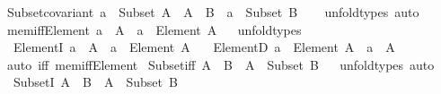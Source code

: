 \begin{isabellebody}
\isanewline
{}\isamarkupfalse%
\ Subset{\isacharunderscore}{\kern0pt}covariant{\isacharcolon}{\kern0pt}\ {\isachardoublequoteopen}a\ {\isacharcolon}{\kern0pt}\ Subset\ A\ {\isasymLongrightarrow}\ A\ {\isasymsubseteq}\ B\ {\isasymLongrightarrow}\ a\ {\isacharcolon}{\kern0pt}\ Subset\ B{\isachardoublequoteclose}\isanewline
%
\isadelimproof
\ \ %
\endisadelimproof
%
\isatagproof
{}\isamarkupfalse%
\ unfold{\isacharunderscore}{\kern0pt}types\ auto%
\endisatagproof
{\isafoldproof}%
%
\isadelimproof
\isanewline
%
\endisadelimproof
\isanewline
{}\isamarkupfalse%
\ mem{\isacharunderscore}{\kern0pt}iff{\isacharunderscore}{\kern0pt}Element{\isacharcolon}{\kern0pt}\ {\isachardoublequoteopen}a\ {\isasymin}\ A\ {\isasymlongleftrightarrow}\ a\ {\isacharcolon}{\kern0pt}\ Element\ A{\isachardoublequoteclose}%
\isadelimproof
\ %
\endisadelimproof
%
\isatagproof
{}\isamarkupfalse%
\ unfold{\isacharunderscore}{\kern0pt}types%
\endisatagproof
{\isafoldproof}%
%
\isadelimproof
%
\endisadelimproof
\isanewline
\isanewline
{}\isamarkupfalse%
\isanewline
\ \ ElementI{\isacharcolon}{\kern0pt}\ {\isachardoublequoteopen}a\ {\isasymin}\ A\ {\isasymLongrightarrow}\ a\ {\isacharcolon}{\kern0pt}\ Element\ A{\isachardoublequoteclose}\ \isanewline
\ \ ElementD{\isacharcolon}{\kern0pt}\ {\isachardoublequoteopen}a\ {\isacharcolon}{\kern0pt}\ Element\ A\ {\isasymLongrightarrow}\ a\ {\isasymin}\ A{\isachardoublequoteclose}\isanewline
%
\isadelimproof
\ \ %
\endisadelimproof
%
\isatagproof
{}\isamarkupfalse%
\ {\isacharparenleft}{\kern0pt}auto\ iff{\isacharcolon}{\kern0pt}\ mem{\isacharunderscore}{\kern0pt}iff{\isacharunderscore}{\kern0pt}Element{\isacharparenright}{\kern0pt}%
\endisatagproof
{\isafoldproof}%
%
\isadelimproof
\isanewline
%
\endisadelimproof
\isanewline
{}\isamarkupfalse%
\ Subset{\isacharunderscore}{\kern0pt}iff{\isacharcolon}{\kern0pt}\ {\isachardoublequoteopen}A\ {\isasymsubseteq}\ B\ {\isasymlongleftrightarrow}\ A\ {\isacharcolon}{\kern0pt}\ Subset\ B{\isachardoublequoteclose}%
\isadelimproof
\ %
\endisadelimproof
%
\isatagproof
{}\isamarkupfalse%
\ unfold{\isacharunderscore}{\kern0pt}types\ auto%
\endisatagproof
{\isafoldproof}%
%
\isadelimproof
%
\endisadelimproof
\isanewline
\isanewline
{}\isamarkupfalse%
\isanewline
\ \ SubsetI{\isacharcolon}{\kern0pt}\ {\isachardoublequoteopen}A\ {\isasymsubseteq}\ B\ {\isasymLongrightarrow}\ A\ {\isacharcolon}{\kern0pt}\ Subset\ B{\isachardoublequoteclose}\ \isanewline

\end{isabellebody}
